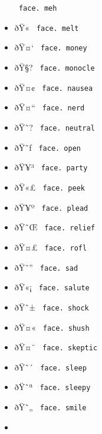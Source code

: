 \begin{itemize}
{  \texttt{\ face.\ meh\ }}
\item
  \label{symbol-face.melt}{{ ðŸ« }
  \texttt{\ face.\ melt\ }}
\item
  \label{symbol-face.money}{{ ðŸ¤` }
  \texttt{\ face.\ money\ }}
\item
  \label{symbol-face.monocle}{{ ðŸ§? }
  \texttt{\ face.\ monocle\ }}
\item
  \label{symbol-face.nausea}{{ ðŸ¤¢ }
  \texttt{\ face.\ nausea\ }}
\item
  \label{symbol-face.nerd}{{ ðŸ¤`` }
  \texttt{\ face.\ nerd\ }}
\item
  \label{symbol-face.neutral}{{ ðŸ˜? }
  \texttt{\ face.\ neutral\ }}
\item
  \label{symbol-face.open}{{ ðŸ˜ƒ }
  \texttt{\ face.\ open\ }}
\item
  \label{symbol-face.party}{{ ðŸ¥³ }
  \texttt{\ face.\ party\ }}
\item
  \label{symbol-face.peek}{{ ðŸ«£ }
  \texttt{\ face.\ peek\ }}
\item
  \label{symbol-face.plead}{{ ðŸ¥º }
  \texttt{\ face.\ plead\ }}
\item
  \label{symbol-face.relief}{{ ðŸ˜Œ }
  \texttt{\ face.\ relief\ }}
\item
  \label{symbol-face.rofl}{{ ðŸ¤£ }
  \texttt{\ face.\ rofl\ }}
\item
  \label{symbol-face.sad}{{ ðŸ˜'' }
  \texttt{\ face.\ sad\ }}
\item
  \label{symbol-face.salute}{{ ðŸ«¡ }
  \texttt{\ face.\ salute\ }}
\item
  \label{symbol-face.shock}{{ ðŸ˜± }
  \texttt{\ face.\ shock\ }}
\item
  \label{symbol-face.shush}{{ ðŸ¤« }
  \texttt{\ face.\ shush\ }}
\item
  \label{symbol-face.skeptic}{{ ðŸ¤¨ }
  \texttt{\ face.\ skeptic\ }}
\item
  \label{symbol-face.sleep}{{ ðŸ˜´ }
  \texttt{\ face.\ sleep\ }}
\item
  \label{symbol-face.sleepy}{{ ðŸ˜ª }
  \texttt{\ face.\ sleepy\ }}
\item
  \label{symbol-face.smile}{{ ðŸ˜„ }
  \texttt{\ face.\ smile\ }}
\item

\end{itemize}
